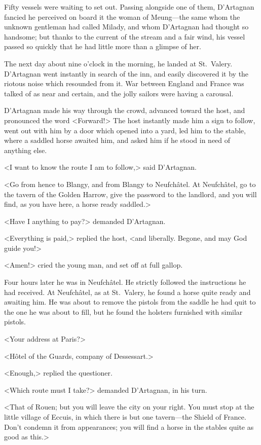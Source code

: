 Fifty vessels were waiting to set out. Passing alongside one of them, D'Artagnan fancied he perceived on board it the woman of Meung—the same whom the unknown gentleman had called Milady, and whom D'Artagnan had thought so handsome; but thanks to the current of the stream and a fair wind, his vessel passed so quickly that he had little more than a glimpse of her. 

The next day about nine o'clock in the morning, he landed at St.~Valery. D'Artagnan went instantly in search of the inn, and easily discovered it by the riotous noise which resounded from it. War between England and France was talked of as near and certain, and the jolly sailors were having a carousal. 

D'Artagnan made his way through the crowd, advanced toward the host, and pronounced the word <Forward!> The host instantly made him a sign to follow, went out with him by a door which opened into a yard, led him to the stable, where a saddled horse awaited him, and asked him if he stood in need of anything else. 

<I want to know the route I am to follow,> said D'Artagnan. 

<Go from hence to Blangy, and from Blangy to Neufchâtel. At Neufchâtel, go to the tavern of the Golden Harrow, give the password to the landlord, and you will find, as you have here, a horse ready saddled.> 

<Have I anything to pay?> demanded D'Artagnan. 

<Everything is paid,> replied the host, <and liberally. Begone, and may God guide you!> 

<Amen!> cried the young man, and set off at full gallop. 

Four hours later he was in Neufchâtel. He strictly followed the instructions he had received. At Neufchâtel, as at St.~Valery, he found a horse quite ready and awaiting him. He was about to remove the pistols from the saddle he had quit to the one he was about to fill, but he found the holsters furnished with similar pistols. 

<Your address at Paris?> 

<Hôtel of the Guards, company of Dessessart.> 

<Enough,> replied the questioner. 

<Which route must I take?> demanded D'Artagnan, in his turn. 

<That of Rouen; but you will leave the city on your right. You must stop at the little village of Eccuis, in which there is but one tavern—the Shield of France. Don't condemn it from appearances; you will find a horse in the stables quite as good as this.> 

